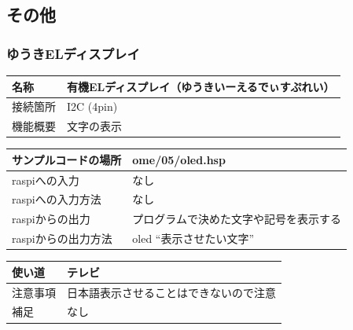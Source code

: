\subsection{その他}
\subsubsection{ゆうきELディスプレイ}\label{oled}
\begin{table}[H]
	\begin{tabular}{|p{\colF}|p{\colG}|}	\hline
	名称 & 有機ELディスプレイ（ゆうきいーえるでぃすぷれい）\\ \hline
	接続箇所 & I2C (4pin)\\ \hline
	機能概要 & 文字の表示\\ \hline
  \end{tabular}
\end{table}

\begin{table}[H]
	\begin{tabular}{|p{\colF}|p{\colG}|}	\hline
	サンプルコードの場所 & ome/05/oled.hsp\\ \hline
	raspiへの入力 & なし\\ \hline
	raspiへの入力方法 & なし\\ \hline
	raspiからの出力 & プログラムで決めた文字や記号を表示する\\ \hline
	raspiからの出力方法 & oled “表示させたい文字”\\ \hline
  \end{tabular}
\end{table}

\begin{table}[H]
	\begin{tabular}{|p{\colF}|p{\colG}|} \hline
	使い道 & テレビ\\ \hline
	注意事項 & 日本語表示させることはできないので注意\\ \hline
	補足 & なし\\ \hline
  \end{tabular}
\end{table}

